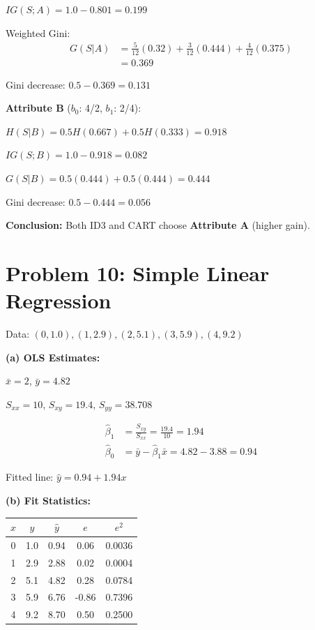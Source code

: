 \documentclass[10pt,twocolumn]{article}
\begin{document}
\(IG(S;A) = 1.0 - 0.801 = \boxed{0.199}\)

Weighted Gini:
\begin{align*}
G(S|A) &= \frac{5}{12}(0.32) + \frac{3}{12}(0.444) + \frac{4}{12}(0.375) \\
&= 0.369
\end{align*}

Gini decrease: \(0.5 - 0.369 = \boxed{0.131}\)

\textbf{Attribute B} (\(b_0\): 4/2, \(b_1\): 2/4):

\(H(S|B) = 0.5H(0.667) + 0.5H(0.333) = 0.918\)

\(IG(S;B) = 1.0 - 0.918 = \boxed{0.082}\)

\(G(S|B) = 0.5(0.444) + 0.5(0.444) = 0.444\)

Gini decrease: \(0.5 - 0.444 = \boxed{0.056}\)

\textbf{Conclusion:} Both ID3 and CART choose \textbf{Attribute A} (higher gain).

\section*{Problem 10: Simple Linear Regression}

Data: \((0,1.0), (1,2.9), (2,5.1), (3,5.9), (4,9.2)\)

\textbf{(a) OLS Estimates:}

\(\bar{x} = 2\), \(\bar{y} = 4.82\)

\(S_{xx} = 10\), \(S_{xy} = 19.4\), \(S_{yy} = 38.708\)

\begin{align*}
\hat{\beta}_1 &= \frac{S_{xy}}{S_{xx}} = \frac{19.4}{10} = \boxed{1.94} \\
\hat{\beta}_0 &= \bar{y} - \hat{\beta}_1\bar{x} = 4.82 - 3.88 = \boxed{0.94}
\end{align*}

Fitted line: \(\hat{y} = 0.94 + 1.94x\)

\textbf{(b) Fit Statistics:}

\begin{small}
\begin{tabular}{ccccc}
\(x\) & \(y\) & \(\hat{y}\) & \(e\) & \(e^2\) \\
\hline
0 & 1.0 & 0.94 & 0.06 & 0.0036 \\
1 & 2.9 & 2.88 & 0.02 & 0.0004 \\
2 & 5.1 & 4.82 & 0.28 & 0.0784 \\
3 & 5.9 & 6.76 & -0.86 & 0.7396 \\
4 & 9.2 & 8.70 & 0.50 & 0.2500 \\
\hline
\end{tabular}
\end{small}
\end{document}
